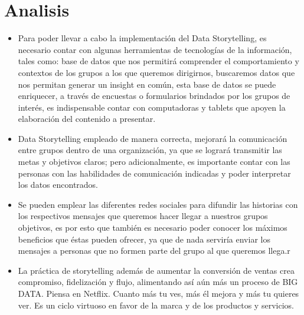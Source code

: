 \documentclass[preprint,12pt]{elsarticle}
\begin{document}
\section{Analisis}
	\label{S:1}


\begin{itemize}

\item Para poder llevar a cabo la implementación del Data Storytelling, es necesario contar con algunas herramientas de tecnologías de la información, tales como: base de datos que nos permitirá comprender el comportamiento y contextos de los grupos a los que queremos dirigirnos, buscaremos datos que nos permitan generar un insight en común, esta base de datos se puede enriquecer, a través de encuestas o formularios brindados por los grupos de interés, es indispensable contar con computadoras y tablets que apoyen la elaboración del contenido a presentar.\\

\item Data Storytelling empleado de manera correcta, mejorará la comunicación entre grupos dentro de una organización, ya que se logrará transmitir las metas y objetivos claros; pero adicionalmente, es importante contar con las personas con las habilidades de comunicación indicadas y poder interpretar los datos encontrados.\\

\item Se pueden emplear las diferentes redes sociales para difundir las historias con los respectivos mensajes que queremos hacer llegar a nuestros grupos objetivos, es por esto que también es necesario poder conocer los máximos beneficios que éstas pueden ofrecer, ya que de nada serviría enviar los mensajes a personas que no formen parte del grupo al que queremos llega.r\\

\item La práctica de storytelling además de aumentar la conversión de ventas crea compromiso, fidelización y flujo, alimentando así aún más un proceso de BIG DATA. Piensa en Netflix. Cuanto más tu ves, más él mejora y más tu quieres ver. Es un ciclo virtuoso en favor de la marca y de los productos y servicios.\\

\end{itemize}

\newpage

	
\end{document}
